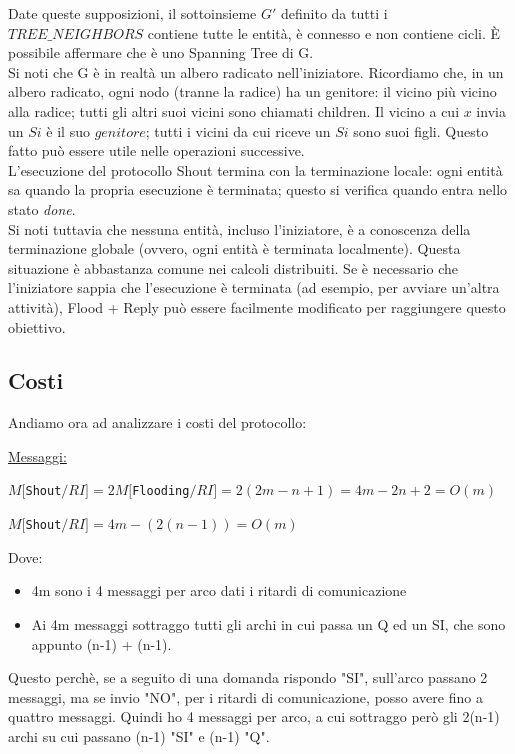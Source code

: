 Date queste supposizioni, il sottoinsieme $G'$ definito da tutti i $TREE\_NEIGHBORS$ contiene tutte le entità, è connesso e non contiene cicli. È possibile affermare che è uno Spanning Tree di G.\\
Si noti che G è in realtà un albero radicato nell'iniziatore. Ricordiamo che, in un albero radicato, ogni nodo (tranne la radice) ha un genitore: il vicino più vicino alla radice; tutti gli altri suoi vicini sono chiamati children. Il vicino a cui $x$ invia un $Si$ è il suo $genitore$; tutti i vicini da cui riceve un $Si$ sono suoi figli. Questo fatto può essere utile nelle operazioni successive.\\
L'esecuzione del protocollo Shout termina con la terminazione locale: ogni entità sa quando la propria esecuzione è terminata; questo si verifica quando entra nello stato \textit{done}.\\
Si noti tuttavia che nessuna entità, incluso l'iniziatore, è a conoscenza della terminazione globale (ovvero, ogni entità è terminata localmente). Questa situazione è abbastanza comune nei calcoli distribuiti. Se è necessario che l'iniziatore sappia che l'esecuzione è terminata (ad esempio, per avviare un'altra attività), Flood + Reply può essere facilmente modificato per raggiungere questo obiettivo.

\subsection{Costi}
Andiamo ora ad analizzare i costi del protocollo:

\underline{Messaggi:}
\begin{center}
  $M[$\texttt{Shout}$/RI] = 2 M[$\texttt{Flooding}$/RI] = 2(2m-n+1) = 4m - 2n + 2 = O(m)$
\end{center}
\begin{center}
  $M[$\texttt{Shout}$/RI] = 4m - (2(n-1)) = O(m)$
\end{center}
Dove:
\begin{itemize}
    \item 4m sono i 4 messaggi per arco dati i ritardi di comunicazione
    \item Ai 4m messaggi sottraggo tutti gli archi in cui passa un Q ed un SI, che sono appunto (n-1) + (n-1).
\end{itemize}

Questo perchè, se a seguito di una domanda rispondo "SI", sull'arco passano 2 messaggi, ma se invio "NO", per i ritardi di comunicazione, posso avere fino a quattro messaggi. Quindi ho 4 messaggi per arco, a cui sottraggo però gli 2(n-1) archi su cui passano (n-1) "SI" e (n-1) "Q".

